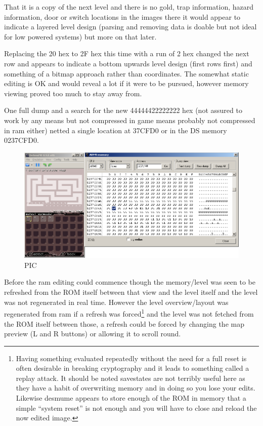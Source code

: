 \documentclass[
]{book}
\begin{document}
That it is a copy of the next level and there is no gold, trap information, hazard information, door or switch locations in the images there it would appear to indicate a layered level design (parsing and removing data is doable but not ideal for low powered systems) but more on that later.

Replacing the 20 hex to 2F hex this time with a run of 2 hex changed the next row and appears to indicate a bottom upwards level design (first rows first) and something of a bitmap approach rather than coordinates. The somewhat static editing is OK and would reveal a lot if it were to be pursued, however memory viewing proved too much to stay away from.

One full dump and a search for the new 44444422222222 hex (not assured to work by any means but not compressed in game means probably not compressed in ram either) netted a single location at 37CFD0 or in the DS memory 0237CFD0.

\begin{figure}
\centering
\includegraphics{images/173_home_fast6191_romhackingguide_unrenamed_fil___ers_romhackingguideleveleditingworkedNplus5.png}
\caption{PIC}
\end{figure}

Before the ram editing could commence though the memory/level was seen to be refreshed from the ROM itself between that view and the level itself and the level was not regenerated in real time. However the level overview/layout was regenerated from ram if a refresh was forced\footnote{Having something evaluated repeatedly without the need for a full reset is often desirable in breaking cryptography and it leads to something called a replay attack. It should be noted savestates are not terribly useful here as they have a habit of overwriting memory and in doing so you lose your edits. Likewise desmume appears to store enough of the ROM in memory that a simple ``system reset'' is not enough and you will have to close and reload the now edited image.} and the level was not fetched from the ROM itself between those, a refresh could be forced by changing the map preview (L and R buttons) or allowing it to scroll round.
\end{document}
